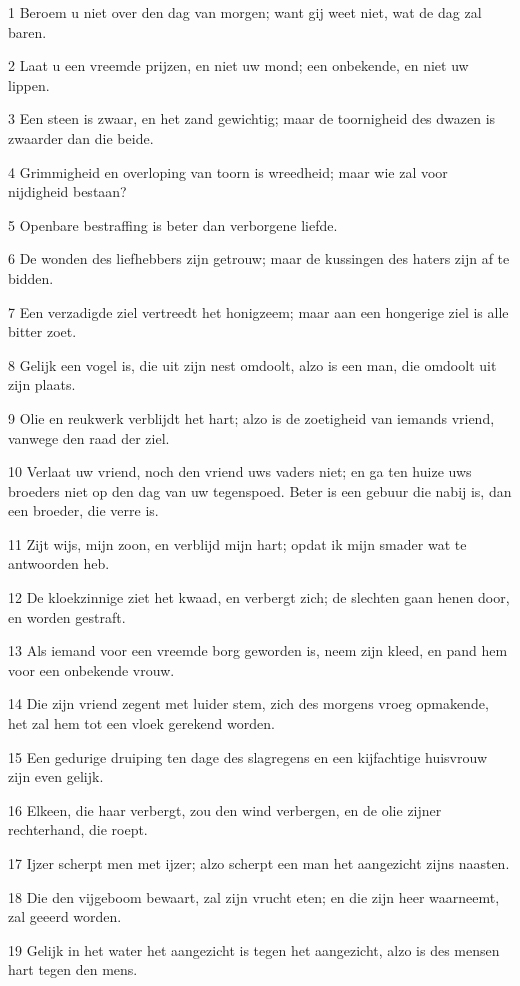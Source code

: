 \par 1 Beroem u niet over den dag van morgen; want gij weet niet, wat de dag zal baren.
\par 2 Laat u een vreemde prijzen, en niet uw mond; een onbekende, en niet uw lippen.
\par 3 Een steen is zwaar, en het zand gewichtig; maar de toornigheid des dwazen is zwaarder dan die beide.
\par 4 Grimmigheid en overloping van toorn is wreedheid; maar wie zal voor nijdigheid bestaan?
\par 5 Openbare bestraffing is beter dan verborgene liefde.
\par 6 De wonden des liefhebbers zijn getrouw; maar de kussingen des haters zijn af te bidden.
\par 7 Een verzadigde ziel vertreedt het honigzeem; maar aan een hongerige ziel is alle bitter zoet.
\par 8 Gelijk een vogel is, die uit zijn nest omdoolt, alzo is een man, die omdoolt uit zijn plaats.
\par 9 Olie en reukwerk verblijdt het hart; alzo is de zoetigheid van iemands vriend, vanwege den raad der ziel.
\par 10 Verlaat uw vriend, noch den vriend uws vaders niet; en ga ten huize uws broeders niet op den dag van uw tegenspoed. Beter is een gebuur die nabij is, dan een broeder, die verre is.
\par 11 Zijt wijs, mijn zoon, en verblijd mijn hart; opdat ik mijn smader wat te antwoorden heb.
\par 12 De kloekzinnige ziet het kwaad, en verbergt zich; de slechten gaan henen door, en worden gestraft.
\par 13 Als iemand voor een vreemde borg geworden is, neem zijn kleed, en pand hem voor een onbekende vrouw.
\par 14 Die zijn vriend zegent met luider stem, zich des morgens vroeg opmakende, het zal hem tot een vloek gerekend worden.
\par 15 Een gedurige druiping ten dage des slagregens en een kijfachtige huisvrouw zijn even gelijk.
\par 16 Elkeen, die haar verbergt, zou den wind verbergen, en de olie zijner rechterhand, die roept.
\par 17 Ijzer scherpt men met ijzer; alzo scherpt een man het aangezicht zijns naasten.
\par 18 Die den vijgeboom bewaart, zal zijn vrucht eten; en die zijn heer waarneemt, zal geeerd worden.
\par 19 Gelijk in het water het aangezicht is tegen het aangezicht, alzo is des mensen hart tegen den mens.
